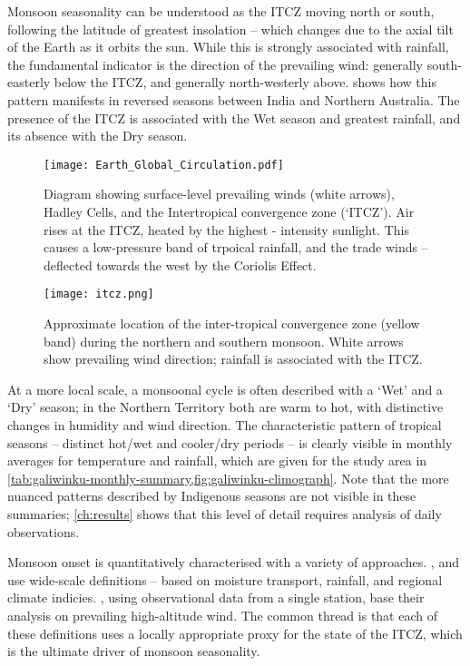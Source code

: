 Monsoon seasonality can be understood as the ITCZ moving north or south,
following the latitude of greatest insolation -- which changes due to the
axial tilt of the Earth as it orbits the sun.  While this is strongly
associated with rainfall, the fundamental indicator is the direction of
the prevailing wind: generally south-easterly below the ITCZ, and generally
north-westerly above.   shows how this pattern
manifests in reversed seasons between India and Northern Australia.
The presence of the ITCZ is associated with the Wet season and greatest
rainfall, and its absence with the Dry season.

\begin{figure}[p]
    \centering
    \texttt{[image: Earth\_Global\_Circulation.pdf]}
    \caption[Hadley Cells and trade-winds]{
        Diagram showing surface-level prevailing winds (white arrows),
        Hadley Cells, and the Intertropical convergence zone (`ITCZ').
        Air rises at the ITCZ, heated by the highest - intensity sunlight.
        This causes a low-pressure band of trpoical rainfall, and the
        trade winds -- deflected towards the west by the Coriolis Effect.
        \citep[image:][]{kaidor2013}
        }
    \label{fig:hadley-cells}
\vspace{1cm}
    \texttt{[image: itcz.png]}
    \caption[ITCZ showing northern and southern monsoon]{
        Approximate location of the inter-tropical convergence zone
        (yellow band) during the northern and southern monsoon.
        White arrows show prevailing wind direction; rainfall is
        associated with the ITCZ.  \citep[image:][]{boos2014}}
    \label{fig:itcz-india-aus}
\end{figure}

At a more local scale, a monsoonal cycle is often described with a `Wet' and a
`Dry' season; in the Northern Territory both are warm to hot, with distinctive
changes in humidity and wind direction.  The characteristic pattern of tropical
seasons -- distinct hot/wet and cooler/dry periods -- is clearly visible in
monthly averages for temperature and rainfall, which are given for the study
area in \cref{tab:galiwinku-monthly-summary,fig:galiwinku-climograph}.
Note that the more nuanced patterns described by Indigenous seasons are not
visible in these summaries; \cref{ch:results} shows that this level of detail
requires analysis of daily observations.


Monsoon onset is quantitatively characterised with a variety of approaches.
\citet{sultan2003,fasullo2002}, and \citet{wu1998} use wide-scale definitions
-- based on moisture transport, rainfall, and regional climate indicies.
\citet{hendon1990}, using observational data from a single station, base their
analysis on prevailing high-altitude wind.  The common thread is that each of
these definitions uses a locally appropriate proxy for the state of the ITCZ,
which is the ultimate driver of monsoon seasonality.

